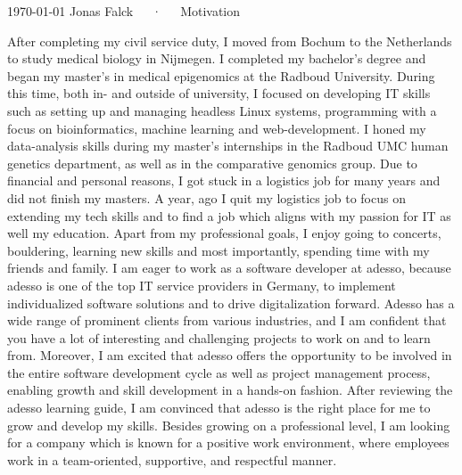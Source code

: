 \documentclass[11pt, a4paper]{awesome-cv}
\begin{document}
\makecvheader[R]

\makecvfooter
  {\today}
  {Jonas Falck~~~·~~~Motivation}
  {}

\makelettertitle
\begin{cvletter}

After completing my civil service duty, I moved from Bochum to the Netherlands to study medical biology in Nijmegen. 
I completed my bachelor’s degree and began my master's in medical epigenomics at the Radboud University. 
During this time, both in- and outside of university, I focused on developing IT skills such as setting up and managing headless Linux systems, programming with a focus on bioinformatics, machine learning and web-development. 
I honed my data-analysis skills during my master's internships in the Radboud UMC human genetics department, as well as in the comparative genomics group. 
Due to financial and personal reasons, I got stuck in a logistics job for many years and did not finish my masters.
A year, ago I quit my logistics job to focus on extending my tech skills and to find a job which aligns with my passion for IT as well my education.
Apart from my professional goals, I enjoy going to concerts, bouldering, learning new skills and most importantly, spending time with my friends and family.
I am eager to work as a software developer at adesso, because adesso is one of the top IT service providers in Germany, to implement individualized software solutions and to drive digitalization forward.
Adesso has a wide range of prominent clients from various industries, and I am confident that you have a lot of interesting and challenging projects to work on and to learn from.
Moreover, I am excited that adesso offers the opportunity to be involved in the entire software development cycle as well as project management process, enabling growth and skill development in a hands-on fashion.
After reviewing the adesso learning guide, I am convinced that adesso is the right place for me to grow and develop my skills.
Besides growing on a professional level, I am looking for a company which is known for a positive work environment, where employees work in a team-oriented, supportive, and respectful manner.

\end{cvletter}
\end{document}
